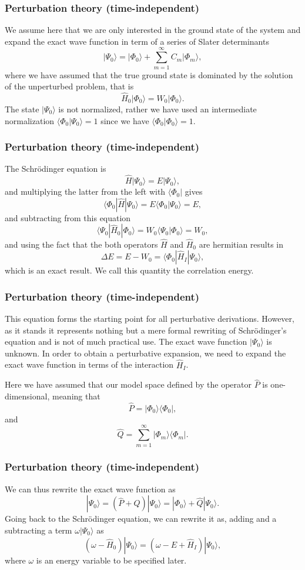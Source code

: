 \documentclass[compress]{beamer}
\begin{document}
\frame
{
\frametitle{Perturbation theory (time-independent)}
\begin{small}
{\scriptsize
We assume here that we are only interested in the ground state of the system and 
expand the exact wave function in term of a series of Slater determinants
\[
|\Psi_0\rangle = |\Phi_0\rangle + \sum_{m=1}^{\infty}C_m|\Phi_m\rangle,
\]
where we have assumed that the true ground state is dominated by the 
solution of the unperturbed problem, that is
\[
\hat{H}_0|\Phi_0\rangle= W_0|\Phi_0\rangle.
\]
The state $|\Psi_0\rangle$ is not normalized, rather we have used an intermediate 
normalization $\langle \Phi_0 |\Psi_0\rangle=1$ since we have $\langle \Phi_0|\Phi_0\rangle=1$. 
}
\end{small}
}


\frame
{
\frametitle{Perturbation theory (time-independent)}
\begin{small}
{\scriptsize
The Schr\"odinger equation is
\[
\hat{H}|\Psi_0\rangle = E|\Psi_0\rangle,
\]
and multiplying the latter from the left with $\langle \Phi_0|$ gives
\[
\langle \Phi_0|\hat{H}|\Psi_0\rangle = E\langle \Phi_0|\Psi_0\rangle=E,
\]
and subtracting from this equation
\[
\langle \Psi_0|\hat{H}_0|\Phi_0\rangle= W_0\langle \Psi_0|\Phi_0\rangle=W_0,
\]
and using the fact that the both operators $\hat{H}$ and $\hat{H}_0$ are hermitian 
results in
\[
\Delta E=E-W_0=\langle \Phi_0|\hat{H}_I|\Psi_0\rangle,
\]
which is an exact result. We call this quantity the correlation energy.
}
\end{small}
}


\frame
{
\frametitle{Perturbation theory (time-independent)}
\begin{small}
{\scriptsize
This equation forms the starting point for all perturbative derivations. However,
as it stands it represents nothing but a mere formal rewriting of Schr\"odinger's equation and is not of much practical use. The exact wave function $|\Psi_0\rangle$ is unknown. In order to obtain a perturbative expansion, we need to expand the exact wave function in terms of the interaction $\hat{H}_I$. 

Here we have assumed that our model space defined by the operator $\hat{P}$ is one-dimensional, meaning that
\[
\hat{P}= |\Phi_0\rangle \langle \Phi_0|,
\]
and 
\[
\hat{Q}=\sum_{m=1}^{\infty}|\Phi_m\rangle \langle \Phi_m|.
\]
}
\end{small}
}


\frame
{
\frametitle{Perturbation theory (time-independent)}
\begin{small}
{\scriptsize
We can thus rewrite the exact wave function as
\[
|\Psi_0\rangle= (\hat{P}+\hat{Q})|\Psi_0\rangle=|\Phi_0\rangle+\hat{Q}|\Psi_0\rangle.
\]
Going back to the Schr\"odinger equation, we can rewrite it as, adding and a subtracting a term $\omega |\Psi_0\rangle$ as
\[
\left(\omega-\hat{H}_0\right)|\Psi_0\rangle=\left(\omega-E+\hat{H}_I\right)|\Psi_0\rangle,
\]
where $\omega$ is an energy variable to be specified later. 
}
\end{small}
}
\end{document}
